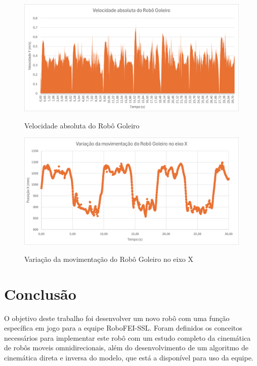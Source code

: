 \documentclass[deposito, acronym, symbols]{fei}
\begin{document}
\begin{figure}[!htb]
    \centering
    \caption{Velocidade absoluta do Robô Goleiro}
    \includegraphics[scale=0.6]{Imagens/Resultados finais/Velocidade absoluta do Robô Goleiro.png}
    \label{fig:velogoleiro}
\end{figure}

\begin{figure}[!htb]
    \centering
    \caption{Variação da movimentação do Robô Goleiro no eixo X 
}
    \includegraphics[scale=0.6]{Imagens/Resultados finais/Variação do Robô goleiro.png}
    \label{fig:variaçãogoleiro}
\end{figure}

\chapter{Conclusão}

O objetivo deste trabalho foi desenvolver um novo robô com uma função específica em jogo para a equipe RoboFEI-SSL. Foram definidos os conceitos necessários para implementar este robô com um estudo completo da cinemática de robôs moveis omnidirecionais, além do desenvolvimento de um algoritmo de cinemática direta e inversa do modelo, que está a disponível para uso da equipe.
\end{document}
